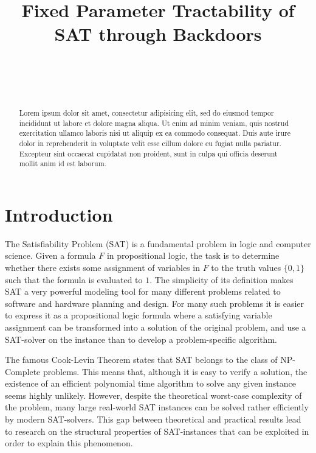 \documentclass[11pt,a4paper]{article}
\title{Fixed Parameter Tractability of SAT through Backdoors}
\author{
 \authorname{Rupert Ettrich} \\
 \studentnumber{01129393} \\
 \curriculum{066 931 Logic and Computation} \\
 \email{rupert.ettrich@gmail.com}
}
\theoremstyle{definition}
\begin{document}
\maketitle

\begin{abstract}
Lorem ipsum dolor sit amet, consectetur adipisicing elit, sed do eiusmod tempor incididunt ut labore et dolore magna aliqua. Ut enim ad minim veniam, quis nostrud exercitation ullamco laboris nisi ut aliquip ex ea commodo consequat. Duis aute irure dolor in reprehenderit in voluptate velit esse cillum dolore eu fugiat nulla pariatur. Excepteur sint occaecat cupidatat non proident, sunt in culpa qui officia deserunt mollit anim id est laborum. 
\end{abstract}

\section{Introduction}

The Satisfiability Problem (SAT) is a fundamental problem in logic and computer science. Given a formula $F$ in propositional logic, the task is to determine whether there exists some assignment of variables in $F$ to the truth values $\{0,1\}$ such that the formula is evaluated to $1$. The simplicity of its definition makes SAT a very powerful modeling tool for many different problems related to software and hardware planning and design. For many such problems it is easier to express it as a propositional logic formula where a satisfying variable assignment can be transformed into a solution of the original problem, and use a SAT-solver on the instance than to develop a problem-specific algorithm. 

The famous Cook-Levin Theorem \cite{} states that SAT belongs to the class of NP-Complete problems. This means that, although it is easy to verify a solution, the existence of an efficient polynomial time algorithm to solve any given instance seems highly unlikely. However, despite the theoretical worst-case complexity of the problem, many large real-world SAT instances can be solved rather efficiently by modern SAT-solvers. This gap between theoretical and practical results lead to research on the structural properties of SAT-instances that can be exploited in order to explain this phenomenon. 
\end{document}
